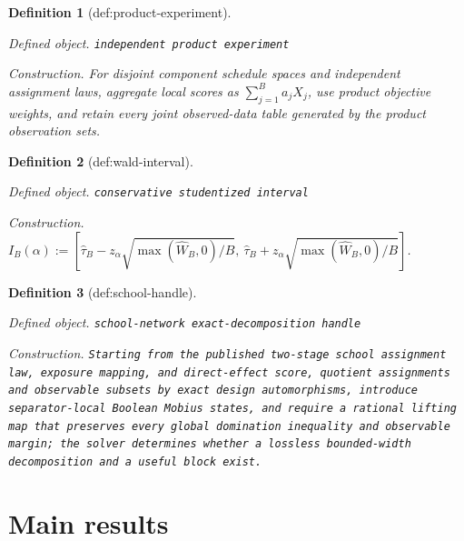 \documentclass{article}
\newtheorem{definition}{Definition}
\begin{document}
\begin{definition}[def:product-experiment]\label{def:product-experiment}
\par\smallskip\noindent\emph{Defined object.} \texttt{independent product experiment}
\par\smallskip\noindent\emph{Construction.} For disjoint component schedule spaces and independent assignment laws, aggregate local scores as \(\sum_{j=1}^B a_jX_j\), use product objective weights, and retain every joint observed-data table generated by the product observation sets.
\end{definition}

\begin{definition}[def:wald-interval]\label{def:wald-interval}
\par\smallskip\noindent\emph{Defined object.} \texttt{conservative studentized interval}
\par\smallskip\noindent\emph{Construction.} \(I_B(\alpha):=[\widehat\tau_B-z_\alpha\sqrt{\max(\widehat W_B,0)/B},\ \widehat\tau_B+z_\alpha\sqrt{\max(\widehat W_B,0)/B}]\).
\end{definition}

\begin{definition}[def:school-handle]\label{def:school-handle}
\par\smallskip\noindent\emph{Defined object.} \texttt{school-\allowbreak{}network exact-\allowbreak{}decomposition handle}
\par\smallskip\noindent\emph{Construction.} \texttt{Starting from the published two-\allowbreak{}stage school assignment law,\allowbreak{} exposure mapping,\allowbreak{} and direct-\allowbreak{}effect score,\allowbreak{} quotient assignments and observable subsets by exact design automorphisms,\allowbreak{} introduce separator-\allowbreak{}local Boolean Mobius states,\allowbreak{} and require a rational lifting map that preserves every global domination inequality and observable margin;\allowbreak{} the solver determines whether a lossless bounded-\allowbreak{}width decomposition and a useful block exist.}
\end{definition}

\section{Main results}
\end{document}
